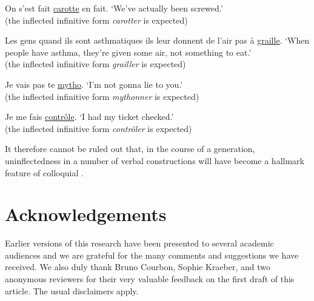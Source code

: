 \documentclass[output=paper,colorlinks,citecolor=brown]{langscibook}
\begin{document}
\begin{exe}
	\ex \label{09ex14} On s'est fait \ul{carotte} en fait.
	\trans ‘We've actually been screwed.’ \\
	(the inflected infinitive form \emph{carotter} is expected)
	
	\ex \label{09ex15} Les gens quand ils sont asthmatiques ils leur donnent de l'air pas à \ul{graille}.
	\trans ‘When people have asthma, they're given some air, not something to eat.’ \\
	(the inflected infinitive form \emph{grailler} is expected)
	
	\ex \label{09ex16} Je vais pas te \ul{mytho}.
	\trans ‘I'm not gonna lie to you.’ \\
	(the inflected infinitive form \emph{mythonner} is expected)
	
	\ex \label{09ex17} Je me fais \ul{contrôle}.
	\trans ‘I had my ticket checked.’ \\
	(the inflected infinitive form \emph{contrôler} is expected)
\end{exe}

It therefore cannot be ruled out that, in the course of a generation, uninflectedness in a number of verbal constructions will have become a hallmark feature of colloquial .
 

\section*{Acknowledgements}
Earlier versions of this research have been presented to several academic audiences and we are grateful for the many comments and suggestions we have received. We also duly thank Bruno Courbon, Sophie Kraeber, and two anonymous reviewers for their very valuable feedback on the first draft of this article. The usual disclaimers apply.



{\sloppy\printbibliography[heading=subbibliography,notkeyword=this]}
\end{document}
